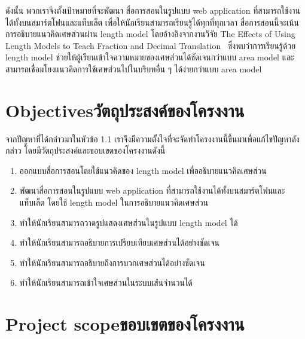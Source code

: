 ดังนั้น พวกเราจึงตั้งเป้าหมายที่จะพัฒนา สื่อการสอนในรูปแบบ web application ที่สามารถใช้งานได้ทั้งบนสมาร์ตโฟนและแท็บเล็ต เพื่อให้นักเรียนสามารถเรียนรู้ได้ทุกที่ทุกเวลา 
สื่อการสอนนี้จะเน้นการอธิบายแนวคิดเศษส่วนผ่าน length model โดยอ้างอิงจากงานวิจัย The Effects of Using Length Models to Teach Fraction and Decimal Translation~\cite{rojo_length_models}
ซึ่งพบว่าการเรียนรู้ด้วย length model ช่วยให้ผู้เรียนเข้าใจความหมายของเศษส่วนได้ชัดเจนกว่าแบบ area model 
และสามารถเชื่อมโยงแนวคิดการใช้เศษส่วนไปในบริบทอื่น ๆ ได้ง่ายกว่าแบบ area model

\section{\ifenglish Objectives\else วัตถุประสงค์ของโครงงาน\fi}
จากปัญหาที่ได้กล่าวมาในหัวข้อ 1.1 เราจึงมีความตั้งใจที่จะจัดทําโครงงานนี้ขึ้นมาเพื่อแก้ไขปัญหาดังกล่าว โดยมีวัตถุประสงค์และขอบเขตของโครงงานดังนี้
\begin{enumerate}
    \item ออกแบบสื่อการสอนโดยใช้แนวคิดของ length model เพื่ออธิบายแนวคิดเศษส่วน
    \item พัฒนาสื่อการสอนในรูปแบบ web application ที่สามารถใช้งานได้ทั้งบนสมาร์ตโฟนและแท็บเล็ต โดยใช้ length model ในการอธิบายแนวคิดเศษส่วน
    \item ทำให้นักเรียนสามารถวาดรูปแสดงเศษส่วนในรูปแบบ length model ได้
    \item ทำให้นักเรียนสามารถอธิบายการเปรียบเทียบเศษส่วนได้อย่างชัดเจน
    \item ทำให้นักเรียนสามารถอธิบายถึงการบวกเศษส่วนได้อย่างชัดเจน
    \item ทำให้นักเรียนสามารถเข้าใจเศษส่วนในระบบเส้นจำนวนได้
\end{enumerate}

\section{\ifenglish Project scope\else ขอบเขตของโครงงาน\fi}


